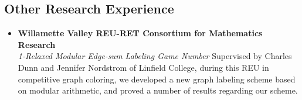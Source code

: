 \documentclass[a4paper]{article}
\newcommand{\bbull}{\ding{118}}
\begin{document}
\subsection*{Other Research Experience \hrulefill} 

\begin{itemize}
  \item[\bbull] \textbf{Willamette Valley REU-RET Consortium for
    Mathematics Research} \\
    \emph{1-Relaxed Modular Edge-sum Labeling Game Number}
    Supervised by Charles Dunn and Jennifer Nordstrom of Linfield
    College, during this REU in competitive graph coloring, we developed
    a new graph labeling scheme based on modular arithmetic, and proved
    a number of results regarding our scheme.
\end{itemize}
\end{document}
